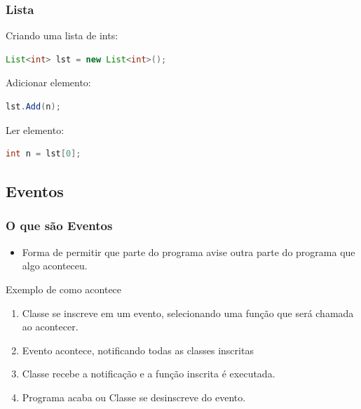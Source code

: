 \documentclass{beamer}
\begin{document}
	\begin{frame}[fragile]
		\frametitle{Lista}

		Criando uma lista de ints:
		\begin{lstlisting}[language=Java,basicstyle=\ttfamily,keywordstyle=\color{blue}]
List<int> lst = new List<int>();
		\end{lstlisting}

		Adicionar elemento:
		\begin{lstlisting}[language=Java,basicstyle=\ttfamily,keywordstyle=\color{blue}]
lst.Add(n);
		\end{lstlisting}

		Ler elemento:
		\begin{lstlisting}[language=Java,basicstyle=\ttfamily,keywordstyle=\color{blue}]
int n = lst[0];
		\end{lstlisting}

	\end{frame}

	\subsection{Eventos}
	\begin{frame}
		\frametitle{O que são Eventos}
		\begin{itemize}
			\item Forma de permitir que parte do programa avise outra parte do
				programa que algo aconteceu.
		\end{itemize}

		Exemplo de como acontece

		\begin{enumerate}
			\item Classe se inscreve em um evento, selecionando uma função que
				será chamada ao acontecer.

			\item Evento acontece, notificando todas as classes inscritas

			\item Classe recebe a notificação e a função inscrita é executada.

			\item Programa acaba ou Classe se desinscreve do evento.
		\end{enumerate}
	\end{frame}
\end{document}
